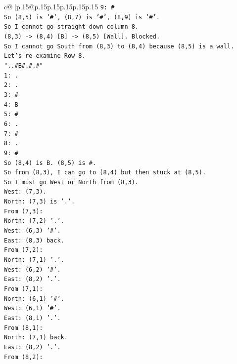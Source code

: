 \documentclass{article}
\begin{document}
{\begin{supertabular}{c@{$\;$}|p{.15\linewidth}@{}p{.15\linewidth}p{.15\linewidth}p{.15\linewidth}p{.15\linewidth}p{.15\linewidth}}
{{{\texttt{9: \#} \\
\texttt{So (8,5) is '\#', (8,7) is '\#', (8,9) is '\#'.} \\
\texttt{So I cannot go straight down column 8.} \\
\texttt{(8,3) {-}> (8,4) {[}B{]} {-}> (8,5) {[}Wall{]}. Blocked.} \\
\texttt{So I cannot go South from (8,3) to (8,4) because (8,5) is a wall.} \\
\texttt{Let's re{-}examine Row 8.} \\
\texttt{"..\#B\#.\#.\#"} \\
\texttt{1: .} \\
\texttt{2: .} \\
\texttt{3: \#} \\
\texttt{4: B} \\
\texttt{5: \#} \\
\texttt{6: .} \\
\texttt{7: \#} \\
\texttt{8: .} \\
\texttt{9: \#} \\
\texttt{So (8,4) is B. (8,5) is \#.} \\
\texttt{So from (8,3), I can go to (8,4) but then stuck at (8,5).} \\
\texttt{So I must go West or North from (8,3).} \\
\texttt{West: (7,3).} \\
\texttt{North: (7,3) is '.'.} \\
\texttt{From (7,3):} \\
\texttt{North: (7,2) '.'.} \\
\texttt{West: (6,3) '\#'.} \\
\texttt{East: (8,3) back.} \\
\texttt{From (7,2):} \\
\texttt{North: (7,1) '.'.} \\
\texttt{West: (6,2) '\#'.} \\
\texttt{East: (8,2) '.'.} \\
\texttt{From (7,1):} \\
\texttt{North: (6,1) '\#'.} \\
\texttt{West: (6,1) '\#'.} \\
\texttt{East: (8,1) '.'.} \\
\texttt{From (8,1):} \\
\texttt{North: (7,1) back.} \\
\texttt{East: (8,2) '.'.} \\
\texttt{From (8,2):} \\
}}}
\end{supertabular}}
\end{document}

